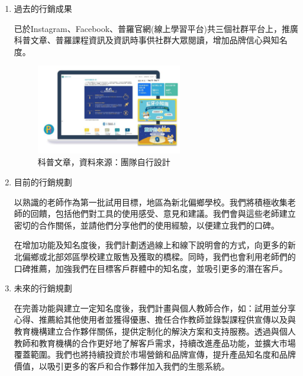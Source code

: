 \begin{enumerate}[label=(\arabic*)]
  \item 過去的行銷成果
    \par 已於Instagram、Facebook、普羅官網(線上學習平台)共三個社群平台上，推廣科普文章、普羅課程資訊及資訊時事供社群大眾閱讀，增加品牌信心與知名度。
    \begin{figure}[H]
      \centering
      \includegraphics[width=0.6\textwidth]{./Strategies/img/article.png}
      \caption{科普文章，資料來源：團隊自行設計}
  	\end{figure}
  \item 目前的行銷規劃
  	\par 以熟識的老師作為第一批試用目標，地區為新北偏鄉學校。我們將積極收集老師的回饋，包括他們對工具的使用感受、意見和建議。我們會與這些老師建立密切的合作關係，並請他們分享他們的使用經驗，以便建立我們的口碑。
  	\par 在增加功能及知名度後，我們計劃透過線上和線下說明會的方式，向更多的新北偏鄉或北部郊區學校建立販售及獲取的橋樑。同時，我們也會利用老師們的口碑推薦，加強我們在目標客戶群體中的知名度，並吸引更多的潛在客戶。
  \item 未來的行銷規劃
  	\par 在完善功能與建立一定知名度後，我們計畫與個人教師合作，如：試用並分享心得、推薦給其他使用者並獲得優惠、擔任合作教師並錄製課程供宣傳以及與教育機構建立合作夥伴關係，提供定制化的解決方案和支持服務。透過與個人教師和教育機構的合作更好地了解客戶需求，持續改進產品功能，並擴大市場覆蓋範圍。我們也將持續投資於市場營銷和品牌宣傳，提升產品知名度和品牌價值，以吸引更多的客戶和合作夥伴加入我們的生態系統。
\end{enumerate}
